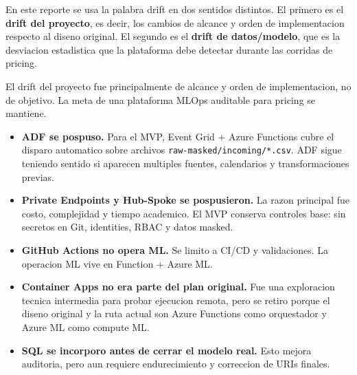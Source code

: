 \documentclass[11pt,letterpaper]{article}
\newcommand{\code}[1]{\texttt{\small #1}}
\begin{document}
En este reporte se usa la palabra drift en dos sentidos distintos. El primero es el \textbf{drift del proyecto}, es decir, los cambios de alcance y orden de implementacion respecto al diseno original. El segundo es el \textbf{drift de datos/modelo}, que es la desviacion estadistica que la plataforma debe detectar durante las corridas de pricing.

El drift del proyecto fue principalmente de alcance y orden de implementacion, no de objetivo. La meta de una plataforma MLOps auditable para pricing se mantiene.

\begin{itemize}[leftmargin=*]
  \item \textbf{ADF se pospuso.} Para el MVP, Event Grid + Azure Functions cubre el disparo automatico sobre archivos \code{raw-masked/incoming/*.csv}. ADF sigue teniendo sentido si aparecen multiples fuentes, calendarios y transformaciones previas.
  \item \textbf{Private Endpoints y Hub-Spoke se pospusieron.} La razon principal fue costo, complejidad y tiempo academico. El MVP conserva controles base: sin secretos en Git, identities, RBAC y datos masked.
  \item \textbf{GitHub Actions no opera ML.} Se limito a CI/CD y validaciones. La operacion ML vive en Function + Azure ML.
  \item \textbf{Container Apps no era parte del plan original.} Fue una exploracion tecnica intermedia para probar ejecucion remota, pero se retiro porque el diseno original y la ruta actual son Azure Functions como orquestador y Azure ML como compute ML.
  \item \textbf{SQL se incorporo antes de cerrar el modelo real.} Esto mejora auditoria, pero aun requiere endurecimiento y correccion de URIs finales.
\end{itemize}
\end{document}
